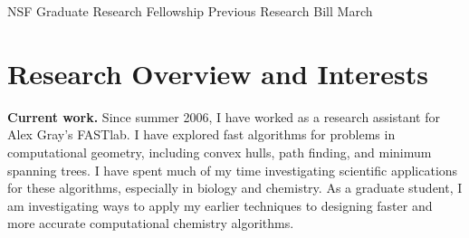 \documentclass[twoside,leqno, 12pt]{article}
\date{}
\begin{document}
\begin{center}
\LARGE{NSF Graduate Research Fellowship Previous Research} \newline
\Large{Bill March}
\end{center}




\section{Research Overview and Interests}
\textbf{Current work.}  Since summer 2006, I have worked as a research assistant for Alex Gray's FASTlab.  I have explored fast algorithms for problems in computational geometry, including convex hulls, path finding, and minimum spanning trees.  I have spent much of my time investigating scientific applications for these algorithms, especially in biology and chemistry.  As a graduate student, I am investigating ways to apply my earlier techniques to designing faster and more accurate computational chemistry algorithms.  

\end{document}
